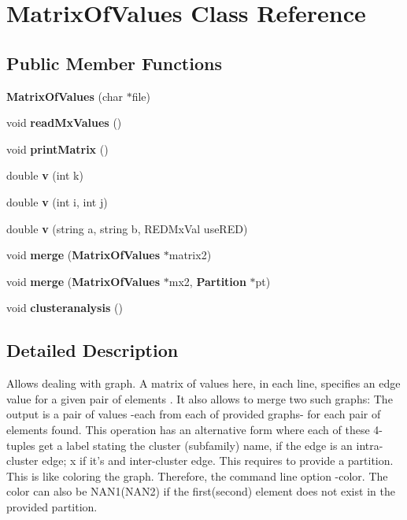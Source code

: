 \section{Matrix\-Of\-Values Class Reference}
\label{classMatrixOfValues}
\subsection*{Public Member Functions}
\begin{CompactItemize}
\item 
{\bf Matrix\-Of\-Values} (char $\ast$file)\label{classMatrixOfValues_a1}

\item 
void {\bf read\-Mx\-Values} ()
\item 
void {\bf print\-Matrix} ()\label{classMatrixOfValues_a3}

\item 
double {\bf v} (int k)\label{classMatrixOfValues_a4}

\item 
double {\bf v} (int i, int j)\label{classMatrixOfValues_a5}

\item 
double {\bf v} (string a, string b, REDMx\-Val use\-RED)
\item 
void {\bf merge} ({\bf Matrix\-Of\-Values} $\ast$matrix2)\label{classMatrixOfValues_a7}

\item 
void {\bf merge} ({\bf Matrix\-Of\-Values} $\ast$mx2, {\bf Partition} $\ast$pt)
\item 
void {\bf clusteranalysis} ()\label{classMatrixOfValues_a9}

\end{CompactItemize}


\subsection{Detailed Description}
Allows dealing with graph. A matrix of values here, in each line, specifies an edge value for a given pair of elements . It also allows to merge two such graphs: The output is a pair of values -each from each of provided graphs- for each pair of elements found. This operation has an alternative form where each of these 4-tuples get a label stating the cluster (subfamily) name, if the edge is an intra-cluster edge; x if it's and inter-cluster edge. This requires to provide a partition. This is like coloring the graph. Therefore, the command line option -color. The color can also be NAN1(NAN2) if the first(second) element does not exist in the provided partition. 



